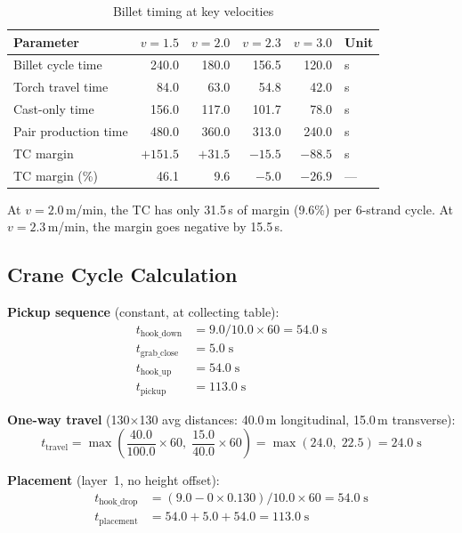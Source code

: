 \documentclass[11pt,a4paper]{article}
\begin{document}
\begin{table}[H]
\centering
\caption{Billet timing at key velocities}
\label{tab:billet-timing}
\begin{tabular}{@{}lrrrrl@{}}
\toprule
Parameter & $v{=}1.5$ & $v{=}2.0$ & $v{=}2.3$ & $v{=}3.0$ & Unit \\
\midrule
Billet cycle time & 240.0 & 180.0 & 156.5 & 120.0 & s \\
Torch travel time & 84.0 & 63.0 & 54.8 & 42.0 & s \\
Cast-only time & 156.0 & 117.0 & 101.7 & 78.0 & s \\
Pair production time & 480.0 & 360.0 & 313.0 & 240.0 & s \\
TC margin & $+151.5$ & $+31.5$ & $-15.5$ & $-88.5$ & s \\
TC margin (\%) & 46.1 & 9.6 & $-5.0$ & $-26.9$ & --- \\
\bottomrule
\end{tabular}
\end{table}

At $v = 2.0$\,m/min, the TC has only 31.5\,s of margin (9.6\%) per 6-strand cycle. At $v = 2.3$\,m/min, the margin goes negative by 15.5\,s.

\subsection{Crane Cycle Calculation}

\textbf{Pickup sequence} (constant, at collecting table):
\begin{align}
t_\text{hook\_down} &= 9.0 / 10.0 \times 60 = 54.0\;\text{s} \\
t_\text{grab\_close} &= 5.0\;\text{s} \\
t_\text{hook\_up} &= 54.0\;\text{s} \\
t_\text{pickup} &= 113.0\;\text{s}
\end{align}

\textbf{One-way travel} (130$\times$130 avg distances: 40.0\,m longitudinal, 15.0\,m transverse):
\begin{equation}
t_\text{travel} = \max\!\left(\frac{40.0}{100.0}\times 60,\;\frac{15.0}{40.0}\times 60\right) = \max(24.0,\;22.5) = 24.0\;\text{s}
\end{equation}

\textbf{Placement} (layer~1, no height offset):
\begin{align}
t_\text{hook\_drop} &= (9.0 - 0 \times 0.130) / 10.0 \times 60 = 54.0\;\text{s} \\
t_\text{placement} &= 54.0 + 5.0 + 54.0 = 113.0\;\text{s}
\end{align}
\end{document}
